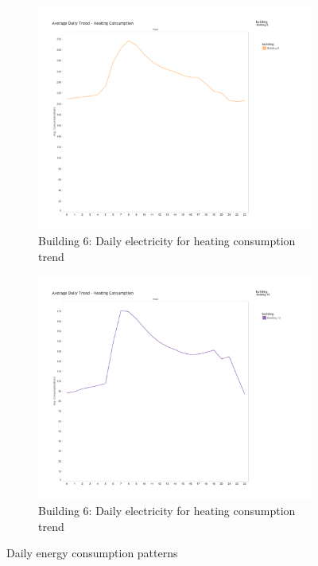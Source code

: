\begin{figure}[h]
        \begin{subfigure}[b]{0.45\textwidth}
                \includegraphics[width=\textwidth]{images/db6_heat}
                \caption{Building 6: Daily electricity for heating consumption trend}
                \label{fig:heat6}
        \end{subfigure}
        \begin{subfigure}[b]{0.45\textwidth}
                        \includegraphics[width=\textwidth]{images/db13_heat}
                        \caption{Building 6: Daily electricity for heating consumption trend}
                        \label{fig:heat13}
       \end{subfigure}
     \caption{Daily energy consumption patterns}\label{fig:animals}
\end{figure}

